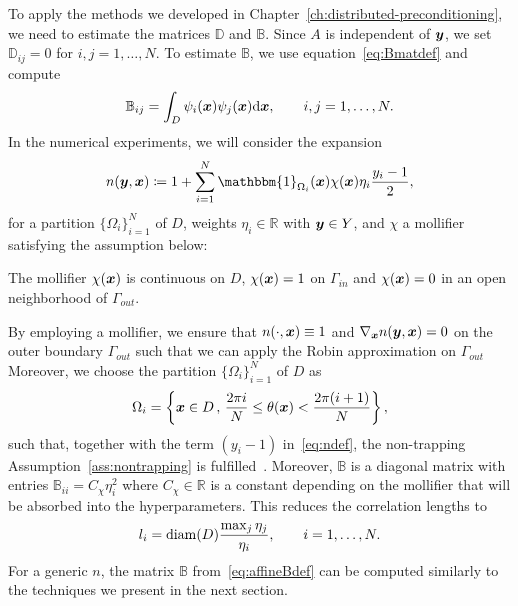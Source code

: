 To apply the methods we developed in Chapter~\ref{ch:distributed-preconditioning}, we need to estimate the matrices $\mathbb{D}$ and $\mathbb{B}$.
Since $A$ is independent of ${\bm{y}}$, we set $\mathbb{D}_{ij}=0$ for $i,j=1,\ldots, N$.
To estimate $\mathbb{B}$, we use equation~\eqref{eq:Bmatdef} and compute
\begin{equation}
    \mathbb{B}_{ij} =\int_D \psi_i({{\bm{x}}})\psi_j({{\bm{x}}}) \mathrm{d}{{\bm{x}}},\qquad i,j=1,\ldots, N.\label{eq:affineBdef}
\end{equation}
In the numerical experiments, we will consider the expansion
\begin{equation}
    n(\y,\x) \coloneqq 1 + \sum_{i=1}^{N} \mathbbm{1}_{\Omega_i}(\x)\chi(\x)\eta_i \frac{y_i-1}{2}, \label{eq:ndef}
\end{equation}
for a partition $\{\Omega_i\}_{i=1}^N$ of $D$, weights $\eta_i\in\mathbb{R}$ with ${\bm{y}}\in Y$, and $\chi$ a mollifier satisfying the assumption below:
\begin{assumption}\label{ass:mollifier}
The mollifier $\chi({{\bm{x}}})$ is continuous on $D$, $\chi({{\bm{x}}})=1$ on $\Gamma_{in}$ and $\chi({{\bm{x}}})=0$ in an open neighborhood of $\Gamma_{out}$.
\end{assumption}

By employing a mollifier, we ensure that $n(\cdot, {{\bm{x}}})\equiv 1$ and $\nabla_{{{\bm{x}}}} n({\bm{y}},{{\bm{x}}})=0$ on the outer boundary $\Gamma_{out}$ such that we can apply the Robin approximation on $\Gamma_{out}$
Moreover, we choose the partition $\{\Omega_i\}_{i=1}^N$ of $D$ as
\begin{equation*}
    \Omega_i = \left\{{{\bm{x}}} \in D \,,\, \frac{2\pi i}{N} \leq \theta({{\bm{x}}}) < \frac{2\pi (i+1)}{N} \right\},
\end{equation*}
such that, together with the term $(y_i-1)$ in~\eqref{eq:ndef}, the non-trapping Assumption~\ref{ass:nontrapping} is fulfilled~\cite[Condition~2.6]{graham2019}.
Moreover, $\mathbb{B}$ is a diagonal matrix with entries $\mathbb{B}_{ii}=C_\chi\eta_i^2$ where $C_\chi \in \mathbb{R}$ is a constant depending on the mollifier that will be absorbed into the hyperparameters.
This reduces the correlation lengths to
\begin{equation*}
    l_i = \operatorname*{diam}(D) \frac{\max_j \eta_j}{\eta_i}, \qquad i=1,\ldots, N.
\end{equation*}
For a generic $n$, the matrix $\mathbb{B}$ from~\eqref{eq:affineBdef} can be computed similarly to the techniques we present in the next section.

